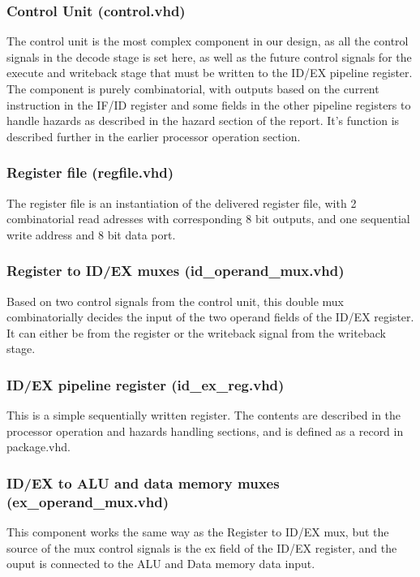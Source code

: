 \documentclass[11pt]{report}
\begin{document}
\subsubsection*{Control Unit (control.vhd)}

The control unit is the most complex component in our design, as all the control
signals in the decode stage is set here, as well as the future control signals for
the execute and writeback stage that must be written to the ID/EX pipeline register.
The component is purely combinatorial, with outputs based on the current instruction in the
IF/ID register and some fields in the other pipeline registers to handle hazards as
described in the hazard section of the report. It's function is described further in the 
earlier processor operation section.

\subsubsection*{Register file (regfile.vhd)}
The register file is an instantiation of the delivered register file, with 
2 combinatorial read adresses with corresponding 8 bit outputs, and one sequential
write address and 8 bit data port.

\subsubsection*{Register to ID/EX muxes (id_operand_mux.vhd)}
Based on two control signals from the control unit, this double mux combinatorially
decides the input of the two operand fields of the ID/EX register. It can 
either be from the register or the writeback signal from the writeback stage.

\subsubsection*{ID/EX pipeline register (id_ex_reg.vhd)}
This is a simple sequentially written register. The contents are described in the 
processor operation and hazards handling sections, and is defined as a record in package.vhd. 
\subsubsection*{ID/EX to ALU and data memory muxes (ex_operand_mux.vhd)}
This component works the same way as the Register to ID/EX mux, but the source of the 
mux control signals is the ex field of the ID/EX register, and the ouput is connected
to the ALU and Data memory data input.
\end{document}
